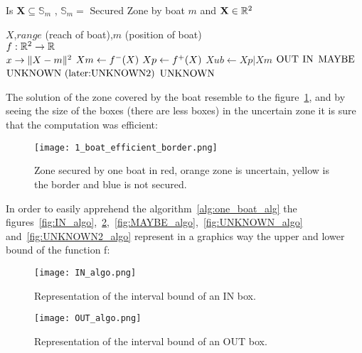 \begin{algorithm}[H]
\caption{Is $\mathbf{X} \subseteq \mathbb{S}_m$ , $\mathbb{S}_m =$ Secured Zone by boat $m$ and $\mathbf{X} \in \mathbb{R^{\textnormal{\ensuremath{2}}}}$ }
\label{alg:one_boat_alg}
\begin{algorithmic}[1]
\REQUIRE $X$,$range $ (reach of boat),$m$ (position of boat)\\
  $ f : \mathbb{R^{\textnormal{\ensuremath{2}}}} \rightarrow \mathbb{R} $\\
   $x \rightarrow \|X-m\|^{\textnormal{\ensuremath{2}}}$
\STATE $Xm \leftarrow f^{\textnormal{\ensuremath{-}}}(X) $
\STATE $Xp \leftarrow f^{\textnormal{\ensuremath{+}}}(X) $
\STATE $Xub \leftarrow Xp | Xm$
\RETURN $\textnormal{OUT}$
\RETURN $\textnormal{IN}$
\ELSE
{}
\RETURN $\textnormal{MAYBE}$ \label{op1}
\ELSE
\RETURN $\textnormal{UNKNOWN (later:UNKNOWN2)}$ \label{op0}
\ENDIF
\ELSE
\RETURN $\textnormal{UNKNOWN}$
\ENDIF
\ENDIF
\end{algorithmic}
\end{algorithm}


The solution of the zone covered by the boat resemble to the figure~\ref{fig:SecureZoneMAYBEOneBoat}, and by seeing the size of the boxes (there are less boxes) in the uncertain zone it is sure that the computation was efficient:

\begin{figure}[H]
\centering
    \texttt{[image: 1\_boat\_efficient\_border.png]}
    \caption{Zone secured by one boat in red, orange zone is uncertain, yellow is the border and blue is not secured.}
    \label{fig:SecureZoneMAYBEOneBoat}
\end{figure}

In order to easily apprehend the algorithm~\ref{alg:one_boat_alg} the figures~\ref{fig:IN_algo},~\ref{fig:OUT_algo},~\ref{fig:MAYBE_algo},~\ref{fig:UNKNOWN_algo} and~\ref{fig:UNKNOWN2_algo} represent in a graphics way the upper and lower bound of the function f:

\begin{figure}[H]
\centering
    \begin{minipage}[b]{0.4\textwidth}
    \texttt{[image: IN\_algo.png]}
    \caption{Representation of the interval bound of an IN box.}
    \label{fig:IN_algo}
    \end{minipage}
    \begin{minipage}[b]{0.4\textwidth}
    \texttt{[image: OUT\_algo.png]}
    \caption{Representation of the interval bound of an OUT box.}
    \label{fig:OUT_algo}
    \end{minipage}
\end{figure}

